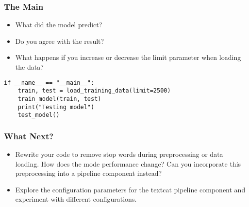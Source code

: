 \begin{frame}[fragile]\frametitle{The Main}

\begin{itemize}
\item What did the model predict? 
\item Do you agree with the result? 
\item What happens if you increase or decrease the limit parameter when loading the data? 
\end{itemize}

\begin{lstlisting}
if __name__ == "__main__":
    train, test = load_training_data(limit=2500)
    train_model(train, test)
    print("Testing model")
    test_model()
\end{lstlisting}



\end{frame}


\begin{frame}[fragile]\frametitle{What Next?}

\begin{itemize}
\item Rewrite your code to remove stop words during preprocessing or data loading. How does the mode performance change? Can you incorporate this preprocessing into a pipeline component instead?
\item Explore the configuration parameters for the textcat pipeline component and experiment with different configurations.
\end{itemize}

\end{frame}






